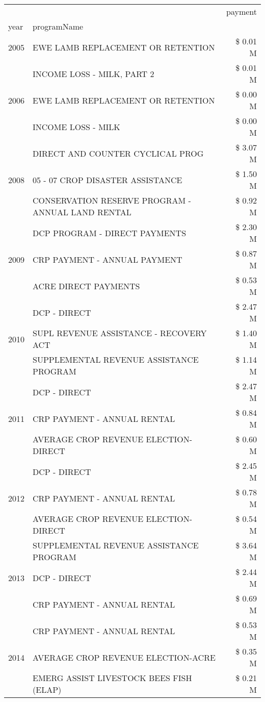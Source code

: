 \begin{tabular}{llr}
\toprule
 &  & payment \\
year & programName &  \\
\midrule
2005 & EWE LAMB REPLACEMENT OR RETENTION & \$ 0.01 M \\
\cline{1-3}
\multirow[t]{3}{*}{2006} & INCOME LOSS - MILK, PART 2 & \$ 0.01 M \\
 & EWE LAMB REPLACEMENT OR RETENTION & \$ 0.00 M \\
 & INCOME LOSS - MILK & \$ 0.00 M \\
\cline{1-3}
\multirow[t]{3}{*}{2008} & DIRECT AND COUNTER CYCLICAL PROG & \$ 3.07 M \\
 & 05 - 07 CROP DISASTER ASSISTANCE & \$ 1.50 M \\
 & CONSERVATION RESERVE PROGRAM - ANNUAL LAND RENTAL & \$ 0.92 M \\
\cline{1-3}
\multirow[t]{3}{*}{2009} & DCP PROGRAM - DIRECT PAYMENTS & \$ 2.30 M \\
 & CRP PAYMENT - ANNUAL PAYMENT & \$ 0.87 M \\
 & ACRE DIRECT PAYMENTS & \$ 0.53 M \\
\cline{1-3}
\multirow[t]{3}{*}{2010} & DCP - DIRECT & \$ 2.47 M \\
 & SUPL REVENUE ASSISTANCE - RECOVERY ACT & \$ 1.40 M \\
 & SUPPLEMENTAL REVENUE ASSISTANCE PROGRAM & \$ 1.14 M \\
\cline{1-3}
\multirow[t]{3}{*}{2011} & DCP - DIRECT & \$ 2.47 M \\
 & CRP PAYMENT - ANNUAL RENTAL & \$ 0.84 M \\
 & AVERAGE CROP REVENUE ELECTION-DIRECT & \$ 0.60 M \\
\cline{1-3}
\multirow[t]{3}{*}{2012} & DCP - DIRECT & \$ 2.45 M \\
 & CRP PAYMENT - ANNUAL RENTAL & \$ 0.78 M \\
 & AVERAGE CROP REVENUE ELECTION-DIRECT & \$ 0.54 M \\
\cline{1-3}
\multirow[t]{3}{*}{2013} & SUPPLEMENTAL REVENUE ASSISTANCE PROGRAM & \$ 3.64 M \\
 & DCP - DIRECT & \$ 2.44 M \\
 & CRP PAYMENT - ANNUAL RENTAL & \$ 0.69 M \\
\cline{1-3}
\multirow[t]{3}{*}{2014} & CRP PAYMENT - ANNUAL RENTAL & \$ 0.53 M \\
 & AVERAGE CROP REVENUE ELECTION-ACRE & \$ 0.35 M \\
 & EMERG ASSIST LIVESTOCK BEES FISH (ELAP) & \$ 0.21 M \\

\end{tabular}
